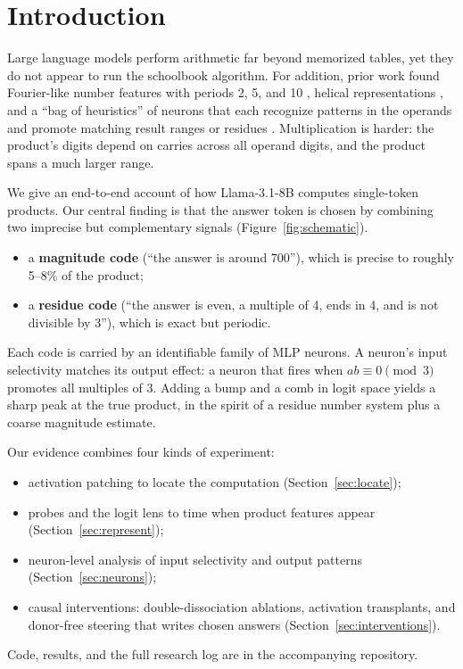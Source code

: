 \documentclass[11pt]{article}
\begin{document}
\section{Introduction}
Large language models perform arithmetic far beyond memorized tables, yet they do not appear to run the schoolbook algorithm. For addition, prior work found Fourier-like number features with periods 2, 5, and 10 \cite{zhou2024}, helical representations \cite{kantamneni2025}, and a ``bag of heuristics'' of neurons that each recognize patterns in the operands and promote matching result ranges or residues \cite{nikankin2024}. Multiplication is harder: the product's digits depend on carries across all operand digits, and the product spans a much larger range.

We give an end-to-end account of how Llama-3.1-8B computes single-token products. Our central finding is that the answer token is chosen by combining two imprecise but complementary signals (Figure~\ref{fig:schematic}).
\begin{itemize}[leftmargin=1.2em,itemsep=1pt]
  \item a \textbf{magnitude code} (``the answer is around 700''), which is precise to roughly 5--8\% of the product;
  \item a \textbf{residue code} (``the answer is even, a multiple of 4, ends in 4, and is not divisible by 3''), which is exact but periodic.
\end{itemize}
Each code is carried by an identifiable family of MLP neurons. A neuron's input selectivity matches its output effect: a neuron that fires when $ab\equiv0\pmod 3$ promotes all multiples of 3. Adding a bump and a comb in logit space yields a sharp peak at the true product, in the spirit of a residue number system plus a coarse magnitude estimate.

Our evidence combines four kinds of experiment:
\begin{itemize}[leftmargin=1.2em,itemsep=1pt]
  \item activation patching to locate the computation (Section~\ref{sec:locate});
  \item probes and the logit lens to time when product features appear (Section~\ref{sec:represent});
  \item neuron-level analysis of input selectivity and output patterns (Section~\ref{sec:neurons});
  \item causal interventions: double-dissociation ablations, activation transplants, and donor-free steering that writes chosen answers (Section~\ref{sec:interventions}).
\end{itemize}
Code, results, and the full research log are in the accompanying repository.
\end{document}
